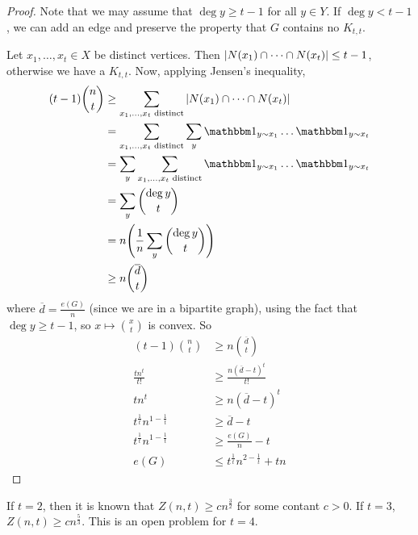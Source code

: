 \begin{proof}
	Note that we may assume that \( \deg y \geq t - 1 \) for all \( y \in Y \).
	If \( \deg y < t - 1 \), we can add an edge and preserve the property that \( G \) contains no \( K_{t,t} \).

	Let \( x_1, \dots, x_t \in X \) be distinct vertices.
	Then \( \abs{N(x_1) \cap \dots \cap N(x_t)} \leq t - 1 \), otherwise we have a \( K_{t,t} \).
	Now, applying Jensen's inequality,
	\begin{align*}
		(t-1) \binom n t &\geq \sum_{x_1, \dots, x_t \text{ distinct}} \abs{N(x_1) \cap \dots \cap N(x_t)} \\
		&= \sum_{x_1, \dots, x_t \text{ distinct}} \sum_y \mathbbm 1_{y \sim x_1} \dots \mathbbm 1_{y \sim x_t} \\
		&= \sum_y \sum_{x_1, \dots, x_t \text{ distinct}} \mathbbm 1_{y \sim x_1} \dots \mathbbm 1_{y \sim x_t} \\
		&= \sum_y \binom{\deg y}{t} \\
		&= n \qty( \frac{1}{n} \sum_y \binom{\deg y}{t} ) \\
		&\geq n \binom{\overline d}{t}
	\end{align*}
	where \( \overline d = \frac{e(G)}{n} \) (since we are in a bipartite graph), using the fact that \( \deg y \geq t - 1 \), so \( x \mapsto \binom x t \) is convex.
	So
	\begin{align*}
		(t-1) \binom n t &\geq n \binom{\overline d}{t} \\
		\frac{tn^t}{t!} &\geq \frac{n(\overline d - t)^t}{t!} \\
		tn^t &\geq n(\overline d - t)^t \\
		t^{\frac{1}{t}} n^{1 - \frac{1}{t}} &\geq \overline d - t \\
		t^{\frac{1}{t}} n^{1 - \frac{1}{t}} &\geq \frac{e(G)}{n} - t \\
		e(G) &\leq t^{\frac{1}{t}} n^{2 - \frac{1}{t}} + tn
	\end{align*}
\end{proof}
\begin{remark}
	If \( t = 2 \), then it is known that \( Z(n,t) \geq cn^{\frac{3}{2}} \) for some contant \( c > 0 \).
	If \( t = 3 \), \( Z(n,t) \geq cn^{\frac{5}{3}} \).
	This is an open problem for \( t = 4 \).
\end{remark}

